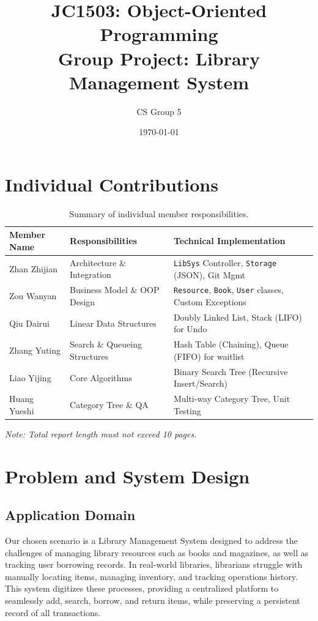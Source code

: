 \documentclass[11pt,a4paper]{article}
\title{JC1503: Object-Oriented Programming \\ \huge Group Project: Library Management System}
\author{CS Group 5}
\date{\today}
\begin{document}
\maketitle

\section*{Individual Contributions}
\begin{table}[h]
    \centering
    \begin{tabular}{lp{6cm}p{5cm}}
        \toprule
        \textbf{Member Name} & \textbf{Responsibilities} & \textbf{Technical Implementation} \\
        \midrule
        Zhan Zhijian & Architecture \& Integration & \texttt{LibSys} Controller, \texttt{Storage} (JSON), Git Mgmt \\
        Zou Wanyan & Business Model \& OOP Design & \texttt{Resource}, \texttt{Book}, \texttt{User} classes, Custom Exceptions \\
        Qiu Dairui & Linear Data Structures & Doubly Linked List, Stack (LIFO) for Undo \\
        Zhang Yuting & Search \& Queueing Structures & Hash Table (Chaining), Queue (FIFO) for waitlist \\
        Liao Yijing & Core Algorithms & Binary Search Tree (Recursive Insert/Search) \\
        Huang Yueshi & Category Tree \& QA & Multi-way Category Tree, Unit Testing \\
        \bottomrule
    \end{tabular}
    \caption{Summary of individual member responsibilities.}
\end{table}

\vfill
\begin{center}
    \textit{Note: Total report length must not exceed 10 pages.}
\end{center}
\newpage

\section{Problem and System Design}
\label{sec:problem_design}

\subsection{Application Domain}
Our chosen scenario is a Library Management System designed to address the challenges of managing library resources such as books and magazines, as well as tracking user borrowing records. In real-world libraries, librarians struggle with manually locating items, managing inventory, and tracking operations history. This system digitizes these processes, providing a centralized platform to seamlessly add, search, borrow, and return items, while preserving a persistent record of all transactions.
\end{document}
